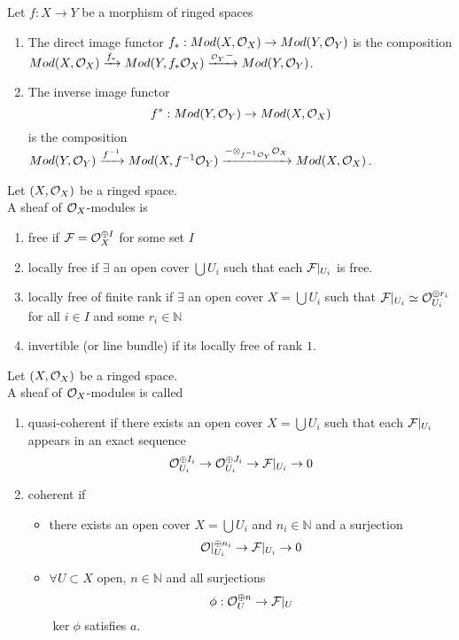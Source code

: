 \documentclass[../main.tex]{subfiles}
\begin{document}
\begin{defn}
	Let $f: X\to Y$ be a morphism of ringed spaces
	\begin{enumerate}
		\item The direct image functor $f_\ast: Mod ( X,\mathcal{O}_X) \to Mod( Y,\mathcal{O}_Y) $ is the composition $Mod( X,\mathcal{O}_X) \xrightarrow{f_\ast} Mod( Y, f_\ast \mathcal{O}_X) \xrightarrow{{}_{\mathcal{O}_Y} -} Mod( Y,\mathcal{O}_Y) $.
		\item The inverse image functor 
			\[ 
			f^{\ast}: Mod( Y,\mathcal{O}_Y) \to Mod( X,\mathcal{O}_X) 
			\]
			is the composition $Mod( Y,\mathcal{O}_Y) \xrightarrow{f^{-1}} Mod( X, f^{-1}\mathcal{O}_Y) \xrightarrow{ - \otimes_{f^{-1}\mathcal{O}_Y} \mathcal{O}_X} Mod( X,\mathcal{O}_X) $.
	\end{enumerate}
\end{defn}
\begin{defn}
	Let $( X,\mathcal{O}_X) $ be a ringed space.\\
	A sheaf of $\mathcal{O}_X$-modules is 
	\begin{enumerate}
	\item free if $ \mathcal{F}= \mathcal{O}_X ^{\oplus I}$ for some set $I$ 
	\item locally free if $\exists $ an open cover $\bigcup U_i$ such that each $\mathcal{F}|_{U_i} $ is free.
	\item locally free of finite rank if $\exists$ an open cover $X= \bigcup U_i$ such that $ \mathcal{F}|_{U_i} \simeq \mathcal{O}_{U_i}^{\oplus r_i}$ for all $i \in I$ and some $r_i \in \mathbb{N}$
	\item invertible (or line bundle) if its locally free of rank $1$.
	\end{enumerate}
\end{defn}
\begin{defn}
	Let $( X,\mathcal{O}_X) $ be a ringed space.\\
	A sheaf of $\mathcal{O}_X$-modules is called 
	\begin{enumerate}
	\item quasi-coherent if there exists an open cover $X= \bigcup U_i$ such that each $ \mathcal{F}|_{U_i} $ appears in an exact sequence
		\[ 
		\mathcal{O}_{U_i} ^{\oplus I_i}\to \mathcal{O}_{U_i} ^{\oplus J_i}\to \mathcal{F}|_{U_i} \to 0
		\]
	
	\item coherent if
		\begin{itemize}
		\item there exists an open cover $X= \bigcup U_i$ and $n_i \in \mathbb{N}$ and a surjection 
			\[ 
			\mathcal{O}|_{U_i}^{\oplus n_i} \to \mathcal{F}|_{U_i} \to 0
			\]
			
		\item $\forall U \subset X$ open, $n \in \mathbb{N}$ and all surjections
			\[ 
			\phi: \mathcal{O}_U^{\oplus n}\to \mathcal{F}|_U
			\]
			$\ker \phi$ satisfies $a$.
		\end{itemize}
	\end{enumerate}
\end{defn}
\end{document}
